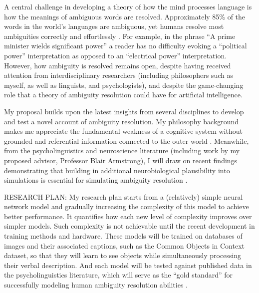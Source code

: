 \documentclass[letterpaper, 12pt]{article}
\begin{document}

A central challenge in developing a theory of how the mind processes language is how the meanings of ambiguous words are resolved. Approximately 85\% of the words in the world's languages are ambiguous, yet humans resolve most ambiguities correctly and effortlessly \citep{KleinRepresentationPolysemousWords2001}.  For example, in the phrase ``A prime minister wields significant power'' a reader has no difficulty evoking a ``political power'' interpretation as opposed to an ``electrical power'' interpretation.  However, how ambiguity is resolved remains open, despite having received attention from interdisciplinary researchers (including philosophers such as myself, as well as linguists, and psychologists), and despite the game-changing role that a theory of ambiguity resolution could have for artificial intelligence.

My proposal builds upon the latest insights from several disciplines to develop and test a novel account of ambiguity resolution. My philosophy background makes me appreciate the fundamental weakness of a cognitive system without grounded and referential information connected to the outer world \citep{searleMindsBrainsPrograms1980}. Meanwhile, from the psycholinguistics and neuroscience literature (including work by my proposed advisor, Professor Blair Armstrong), I will draw on recent findings demonstrating that building in additional neurobiological plausibility into simulations is essential for simulating ambiguity resolution \citep{Armstrong2016Disparatesemanticambiguity}.

RESEARCH PLAN: My research plan starts from a (relatively) simple neural network model and gradually increasing the complexity of this model to achieve better performance. It quantifies how each new level of complexity improves over simpler models. Such complexity is not achievable until the recent development in training methods and hardware. These models will be trained on databases of images and their associated captions, such as the Common Objects in Context dataset, so that they will learn to see objects while simultaneously processing their verbal description. And each model will be tested against published data in the psycholinguistics literature, which will serve as the ``gold standard'' for successfully modeling human ambiguity resolution abilities \citep{Eddington2015Howmeaningsimilarity}.
\end{document}
